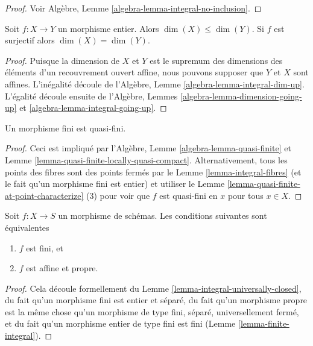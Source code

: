 \begin{proof}
Voir Algèbre, Lemme \ref{algebra-lemma-integral-no-inclusion}.
\end{proof}

\begin{lemma}
\label{lemma-integral-dimension}
Soit $f : X \to Y$ un morphisme entier. Alors $\dim(X) \leq \dim(Y)$. Si $f$
est surjectif alors $\dim(X) = \dim(Y)$.
\end{lemma}

\begin{proof}
Puisque la dimension de $X$ et $Y$ est le supremum
des dimensions des éléments d'un recouvrement ouvert affine,
nous pouvons supposer que $Y$
et $X$ sont affines. L'inégalité
découle de l'Algèbre, Lemme
\ref{algebra-lemma-integral-dim-up}. L'égalité découle ensuite de l'Algèbre,
Lemmes \ref{algebra-lemma-dimension-going-up} et \ref{algebra-lemma-integral-going-up}.
\end{proof}

\begin{lemma}
\label{lemma-finite-quasi-finite}
Un morphisme fini est quasi-fini.
\end{lemma}

\begin{proof}
Ceci est impliqué par l'Algèbre, Lemme \ref{algebra-lemma-quasi-finite} et Lemme
\ref{lemma-quasi-finite-locally-quasi-compact}. Alternativement, tous les points
des fibres sont des points fermés par le Lemme
\ref{lemma-integral-fibres} (et le fait qu'un morphisme fini est entier)
et utiliser le Lemme
\ref{lemma-quasi-finite-at-point-characterize} (3) pour voir que $f$ est quasi-fini
en $x$ pour tous $x \in X$.
\end{proof}

\begin{lemma}
\label{lemma-finite-proper}
Soit $f : X \to S$ un morphisme de schémas. Les conditions suivantes sont équivalentes
\begin{enumerate}
\item $f$ est fini, et
\item $f$ est affine et propre.
\end{enumerate}
\end{lemma}

\begin{proof}
Cela découle formellement
du Lemme \ref{lemma-integral-universally-closed}, du fait qu'un morphisme
fini est entier et séparé, du fait qu'un
morphisme propre est la même chose qu'un morphisme
de type fini, séparé, universellement
fermé, et du fait qu'un morphisme entier de type
fini est fini (Lemme \ref{lemma-finite-integral}).
\end{proof}

